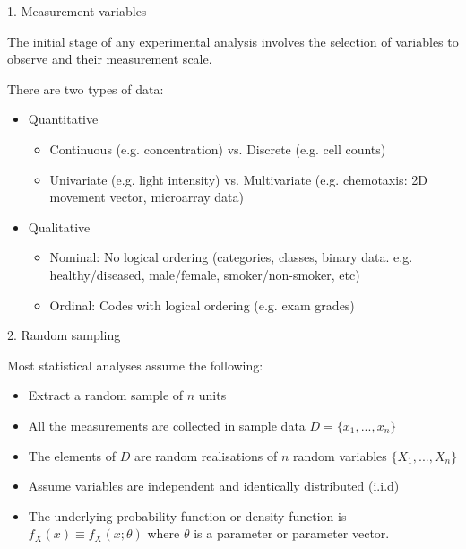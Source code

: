 \documentclass{beamer}
\begin{document}
\begin{frame}{1. Measurement variables}

	The initial stage of any experimental analysis involves the selection of
	variables to observe and their measurement scale.

	\vskip 0.5cm

	There are two types of data:
	\begin{itemize}
		\item Quantitative
		\pause
		\begin{itemize}
			\item Continuous (e.g. concentration) vs. Discrete (e.g. cell counts)
			\item Univariate (e.g. light intensity) vs. Multivariate (e.g. chemotaxis: 2D movement vector, microarray data)
		\end{itemize}
		\item Qualitative
		\pause
		\begin{itemize}
			\item Nominal: No logical ordering (categories, classes, binary data. 
			e.g. healthy/diseased, male/female, smoker/non-smoker, etc)
			\item Ordinal: Codes with logical ordering (e.g. exam grades)
		\end{itemize}
	\end{itemize}

\end{frame}

\begin{frame}{2. Random sampling}

	Most statistical analyses assume the following:
	\begin{itemize}
		\item Extract a random sample of $n$ units
		\item All the measurements are collected in sample data $D = \{x_1, ..., x_n\}$
		\item The elements of $D$ are random realisations of $n$ random variables $\{X_1, ..., X_n\}$
		\item Assume variables are independent and identically distributed (i.i.d)
		\item The underlying probability function or density function is $f_X(x) \equiv f_X(x; \theta)$ where $\theta$ is a 
		parameter or parameter vector. 
	\end{itemize}

\end{frame}
\end{document}
